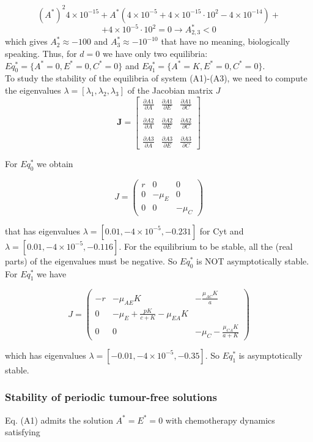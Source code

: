 \[ {(A^*)}^2 4\times 10^{-15} + A^* (4\times 10^{-5} + 4\times 10^{-15} \cdot 10^2 - 4\times 10^{-14}) + \]
\[+ 4\times 10^{-5} \cdot 10^2 = 0 \rightarrow A^*_{2,3} < 0 \]
which gives $A^*_2 \approx -100$ and $A^*_3 \approx -10^{-10}$ that have no meaning, biologically speaking. Thus, for $d=0$ we have only two equilibria: $Eq_0^* = \{ A^*=0, E^*=0, C^*=0\}$ and $Eq_1^* = \{ A^*=K, E^*=0, C^*=0\}$.\\

To study the stability of the equilibria of system (A1)-(A3), we need to compute the eigenvalues $\lambda = [\lambda_1,\lambda_2,\lambda_3]$ of the Jacobian matrix $J$
\[ \mathbf{J} = \begin{bmatrix} \frac{\partial A1}{\partial A} & \frac{\partial A1}{\partial E} & \frac{\partial A1}{\partial C} \\ \\
\frac{\partial A2}{\partial A} & \frac{\partial A2}{\partial E} & \frac{\partial A2}{\partial C}\\ \\
\frac{\partial A3}{\partial A} & \frac{\partial A3}{\partial E} & \frac{\partial A3}{\partial C} \end{bmatrix} \]

For $Eq_0^*$ we obtain

\[ J = \begin{pmatrix} r&0&0 \\ 0&-\mu_E&0 \\ 0&0&-\mu_C \end{pmatrix} \]

that has eigenvalues $\lambda = [0.01,-4\times 10^{-5},-0.231]$ for Cyt and $\lambda = [0.01,-4\times 10^{-5},-0.116]$. For the equilibrium to be stable, all the (real parts) of the eigenvalues must be negative. So $Eq_0^*$ is NOT asymptotically stable.\\

For $Eq_1^*$ we have

\[ J = \begin{pmatrix} -r & -\mu_{AE}K & -\frac{\mu_{AC}K}{a} \\ 0 & -\mu_E + \frac{pK}{c+K} - \mu_{EA}K \\ 0&0& -\mu_C - \frac{\mu_{CA}K}{a+K} \end{pmatrix} \]

which has eigenvalues $\lambda = [-0.01, -4\times 10^{-5}, -0.35]$. So $Eq_1^*$ is asymptotically stable.
\subsubsection{Stability of periodic tumour-free solutions} 
Eq. (A1) admits the solution $A^* = E^* = 0$ with chemotherapy dynamics satisfying

